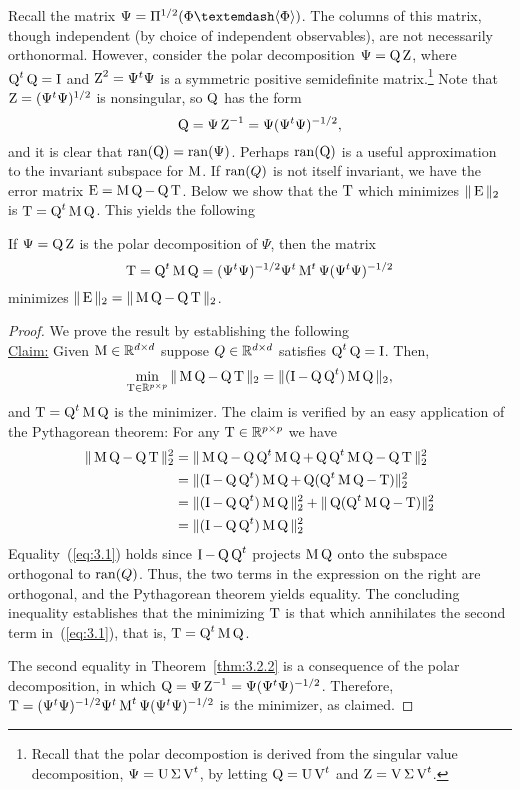 Recall the matrix $\Psi = \Pi^{1/2}(\Phi — \<\Phi\>)$. The columns of this
matrix, though independent (by choice of independent observables), are not
necessarily orthonormal. However, consider the polar decomposition 
$\Psi = \operatorname{Q} \operatorname{Z}$, where $\operatorname{Q}^t\operatorname{Q} = \operatorname{I}$ and $\operatorname{Z}^2 = \Psi^t\Psi$ is a symmetric
positive semidefinite matrix.\footnote{Recall that the polar decompostion is
  derived from the singular value decomposition, $\Psi = \operatorname{U}\Sigma \operatorname{V}^t$, by
  letting $\operatorname{Q} = \operatorname{U} \operatorname{V}^t$ and $\operatorname{Z} = \operatorname{V}\Sigma \operatorname{V}^t$.}
Note that $\operatorname{Z} = (\Psi^t\Psi)^{1/2}$ is nonsingular, so $\operatorname{Q}$ has the form
\[
\operatorname{Q} = \Psi \operatorname{Z}^{-1} = \Psi(\Psi^t\Psi)^{-1/2},
\]
and it is clear that $\operatorname{ran}(\operatorname{Q}) = \operatorname{ran}(\Psi)$. 
Perhaps $\operatorname{ran}(\operatorname{Q})$ is a useful approximation to the invariant
subspace for $\operatorname{M}$. If $\operatorname{ran}(Q)$ is not itself invariant, we have the error 
matrix $\operatorname{E} =\operatorname{M}\operatorname{Q} - \operatorname{Q}\operatorname{T}$.  Below we show that the
$\operatorname{T}$ which minimizes $\|\operatorname{E}\|_2$ is $\operatorname{T} = \operatorname{Q}^t\operatorname{M}\operatorname{Q}$. 
This yields the following
\begin{theorem}
\label{thm:3.2.2}  
If $\Psi = \operatorname{Q}\operatorname{Z}$ is the polar decomposition of $\Psi$, then the matrix
\[
\operatorname{T} = \operatorname{Q}^t\operatorname{M}\operatorname{Q} = (\Psi^t\Psi)^{-1/2}\Psi^t \operatorname{M}^t \Psi (\Psi^t\Psi)^{-1/2}
\]
minimizes $\|\operatorname{E}\|_2 = \|\operatorname{M}\operatorname{Q} - \operatorname{Q}\operatorname{T}\|_2$.
\end{theorem}
\begin{proof}
We prove the result by establishing the following
\\[6pt]
\underline{Claim:} Given $\operatorname{M} \in \mathbb{R}^{d\times d}$ suppose $Q \in  \mathbb{R}^{d\times d}$
satisfies $\operatorname{Q}^t\operatorname{Q} =\operatorname{I}$. 
Then,
\[
\min_{\operatorname{T}\in \mathbb{R}^{p\times p}} \|\operatorname{M}\operatorname{Q} - \operatorname{Q}\operatorname{T}\|_2 = \|(\operatorname{I}- \operatorname{Q}\operatorname{Q}^t)\operatorname{M}\operatorname{Q}\|_2,
\]
and $\operatorname{T} = \operatorname{Q}^t\operatorname{M}\operatorname{Q}$ is the minimizer.
%
%
%
%
The claim is verified by an easy application of the Pythagorean theorem:
For any $\operatorname{T} \in \mathbb{R}^{p\times p}$ we have
\begin{align}
\label{eq:3.1}
\|\M\Q - \Q\T\|^2_2 &= \|\M\Q - \Q\Q^t\M\Q + \Q\Q^t\M\Q - \Q\T\|^2_2 \nonumber\\
&=\|(\I - \Q\Q^t)\M\Q + \Q(\Q^t\M\Q - \T)\|^2_2 \nonumber \\
&=\|(\I - \Q\Q^t)\M\Q\|^2_2 + \|\Q(\Q^t\M\Q - \T)\|^2_2 \\
&=\|(\I - \Q\Q^t)\M\Q\|^2_2 \nonumber
\end{align}
Equality~(\ref{eq:3.1}) holds since $\operatorname{I} - \operatorname{Q}\operatorname{Q}^t$ projects $\operatorname{M}\operatorname{Q}$ onto the
subspace orthogonal to 
$\operatorname{ran}(Q)$. Thus, the two terms in the expression on the right are orthogonal,
and the Pythagorean theorem yields equality. The concluding inequality
establishes that the minimizing $\operatorname{T}$ is that which annihilates the 
second term in~(\ref{eq:3.1}), that is, $\operatorname{T} = \operatorname{Q}^t\operatorname{M}\operatorname{Q}$.

The second equality in Theorem~\ref{thm:3.2.2} is a consequence of the polar decomposition, in
which $\operatorname{Q} = \Psi \operatorname{Z}^{-1} = \Psi(\Psi^t\Psi)^{-1/2}$. Therefore,
$\operatorname{T} = (\Psi^t\Psi)^{-1/2}\Psi^t \operatorname{M}^t \Psi (\Psi^t\Psi)^{-1/2}$
is the minimizer, as claimed.
\end{proof}

